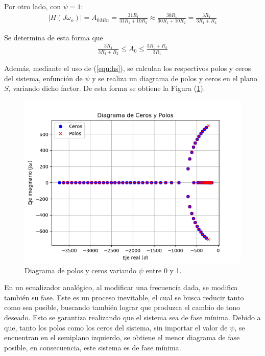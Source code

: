 \documentclass[a4paper]{article}
\begin{document}
Por otro lado, con $\psi = 1$:
\begin{equation*}
\begin{split}
|H\left(J\omega_o\right)| = A_{0Min} = \frac{31 R_{1}}{31 R_{1} + 10 R_{2}} \approx \frac{30 R_{1}}{30 R_{1} + 10 R_{2}} = \frac{3 R_{1}}{3 R_{1} + R_{2}}
\end{split}
\end{equation*}

Se determina de esta forma que
\begin{equation*}
\begin{split}
\frac{3 R_{1}}{3 R_{1} + R_{2}} \leq A_0 \leq \frac{3 R_{1} + R_{2}}{3 R_{1}}
\end{split}
\end{equation*}

Además, mediante el uso de (\ref{equ:hs}), se calculan los respectivos polos y ceros del sistema, enfunción de $\psi$ y se realiza un diagrama de polos y ceros en el plano $S$, variando dicho factor. De esta forma se obtiene la Figura (\ref{fig:zplanepsi}).

\begin{figure}[H]
	\includegraphics[width=\textwidth]{Imagenes/Zplanepsi.png}
\caption{Diagrama de polos y ceros variando $\psi$ entre 0 y 1.}
	\label{fig:zplanepsi}
\end{figure}

En un ecualizador analógico, al modificar una frecuencia dada, se modifica también su fase. Este es un proceso inevitable, el cual se busca reducir tanto como sea posible, buscando también lograr que produzca el cambio de tono deseado. Esto se garantiza realizando que el sistema sea de fase mínima.
Debido a que, tanto los polos como los ceros del sistema, sin importar el valor de $\psi$, se encuentran en el semiplano izquierdo, se obtiene el menor diagrama de fase posible, en consecuencia, este sistema es de fase mínima.
\end{document}
